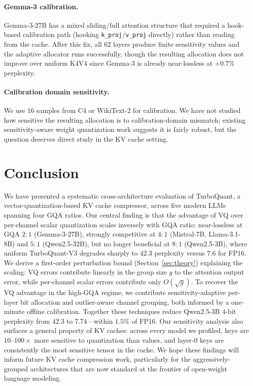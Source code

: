 \documentclass[11pt]{article}
\begin{document}
\paragraph{Gemma-3 calibration.}
Gemma-3-27B has a mixed sliding/full attention structure that required a hook-based calibration path (hooking \texttt{k\_proj}/\texttt{v\_proj} directly) rather than reading from the cache. After this fix, all $62$ layers produce finite sensitivity values and the adaptive allocator runs successfully, though the resulting allocation does not improve over uniform K4V4 since Gemma-3 is already near-lossless at $+0.7\%$ perplexity.

\paragraph{Calibration domain sensitivity.}
We use $16$ samples from C4 or WikiText-2 for calibration. We have not studied how sensitive the resulting allocation is to calibration-domain mismatch; existing sensitivity-aware weight quantization work suggests it is fairly robust, but the question deserves direct study in the KV cache setting.

\section{Conclusion}
\label{sec:conclusion}

We have presented a systematic cross-architecture evaluation of TurboQuant, a vector-quantization-based KV cache compressor, across five modern LLMs spanning four GQA ratios. Our central finding is that the advantage of VQ over per-channel scalar quantization scales inversely with GQA ratio: near-lossless at GQA $2{:}1$ (Gemma-3-27B), strongly competitive at $4{:}1$ (Mistral-7B, Llama-3.1-8B) and $5{:}1$ (Qwen2.5-32B), but no longer beneficial at $8{:}1$ (Qwen2.5-3B), where uniform TurboQuant-V3 degrades sharply to $42.3$ perplexity versus $7.6$ for FP16. We derive a first-order perturbation bound (Section~\ref{sec:theory}) explaining the scaling: VQ errors contribute linearly in the group size $g$ to the attention output error, while per-channel scalar errors contribute only $O(\sqrt{g})$. To recover the VQ advantage in the high-GQA regime, we contribute sensitivity-adaptive per-layer bit allocation and outlier-aware channel grouping, both informed by a one-minute offline calibration. Together these techniques reduce Qwen2.5-3B $4$-bit perplexity from $42.3$ to $7.74$---within $1.5\%$ of FP16. Our sensitivity analysis also surfaces a general property of KV caches: across every model we profiled, keys are $10$--$100\times$ more sensitive to quantization than values, and layer-$0$ keys are consistently the most sensitive tensor in the cache. We hope these findings will inform future KV cache compression work, particularly for the aggressively-grouped architectures that are now standard at the frontier of open-weight language modeling.
\end{document}

